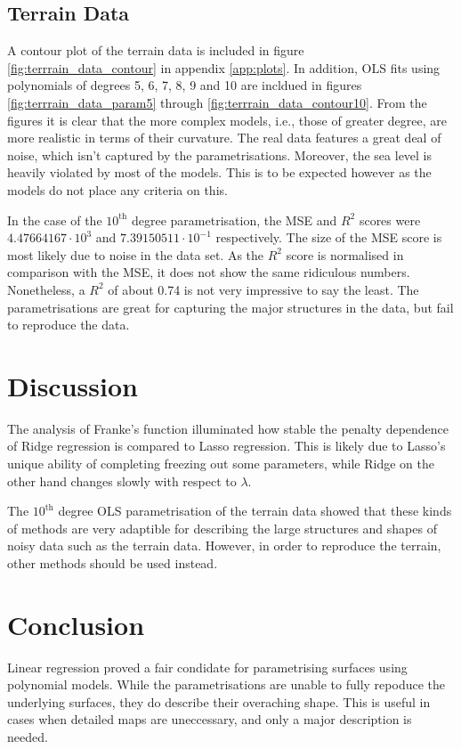 \documentclass[reprint,english]{revtex4-1}
\begin{document}
\subsection{Terrain Data}
A contour plot of the terrain data is included in figure \ref{fig:terrrain_data_contour} in appendix \ref{app:plots}. In addition, OLS fits using polynomials of degrees 5, 6, 7, 8, 9 and 10 are incldued in figures \ref{fig:terrrain_data_param5} through \ref{fig:terrrain_data_contour10}. From the figures it is clear that the more complex models, i.e., those of greater degree, are more realistic in terms of their curvature. The real data features a great deal of noise, which isn't captured by the parametrisations. Moreover, the sea level is heavily violated by most of the models. This is to be expected however as the models do not place any criteria on this.

In the case of the \(10^\text{th}\) degree parametrisation, the MSE and \(R^2\) scores were \(4.47664167\cdot10^3\) and \(7.39150511\cdot10^{-1}\) respectively. The size of the MSE score is most likely due to noise in the data set. As the \(R^2\) score is normalised in comparison with the MSE, it does not show the same ridiculous numbers. Nonetheless, a \(R^2\) of about 0.74 is not very impressive to say the least. The parametrisations are great for capturing the major structures in the data, but fail to reproduce the data.
\section{Discussion}
The analysis of Franke's function illuminated how stable the penalty dependence of Ridge regression is compared to Lasso regression. This is likely due to Lasso's unique ability of completing freezing out some parameters, while Ridge on the other hand changes slowly with respect to \(\lambda\). 

The \(10^\text{th}\) degree OLS parametrisation of the terrain data showed that these kinds of methods are very adaptible for describing the large structures and shapes of noisy data such as the terrain data. However, in order to reproduce the terrain, other methods should be used instead.
\section{Conclusion}
Linear regression proved a fair condidate for parametrising surfaces using polynomial models. While the parametrisations are unable to fully repoduce the underlying surfaces, they do describe their overaching shape. This is useful in cases when detailed maps are uneccessary, and only a major description is needed.
\end{document}
